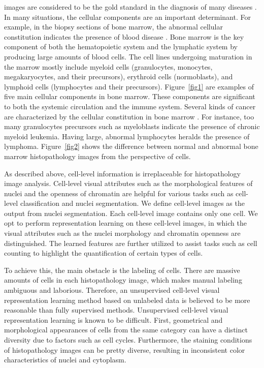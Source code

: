 \documentclass[journal]{IEEEtran}
\begin{document}
 images are considered to be the gold standard in the diagnosis of many diseases \cite{Gurcan2009histopathological}. In many situations, the cellular components are an important determinant. For example, in the biopsy sections of bone marrow, the abnormal cellular constitution indicates the presence of blood disease \cite{Bennett1976Proposals}. Bone marrow is the key component of both the hematopoietic system and the lymphatic system by producing large amounts of blood cells. The cell lines undergoing maturation in the marrow mostly include myeloid cells (granulocytes, monocytes, megakaryocytes, and their precursors), erythroid cells (normoblasts), and lymphoid cells (lymphocytes and their precursors). Figure~\ref{fig1} are examples of five main cellular components in bone marrow. These components are significant to both the systemic circulation and the immune system. Several kinds of cancer are characterized by the cellular constitution in bone marrow \cite{Bennett1976Proposals}. For instance, too many granulocytes precursors such as myeloblasts indicate the presence of chronic myeloid leukemia. Having large, abnormal lymphocytes heralds the presence of lymphoma. Figure~\ref{fig2} shows the difference between normal and abnormal bone marrow histopathology images from the perspective of cells.

As described above, cell-level information is irreplaceable for histopathology image analysis. Cell-level visual attributes such as the morphological features of nuclei and the openness of chromatin are helpful for various tasks such as cell-level classification and nuclei segmentation. We define cell-level images as the output from nuclei segmentation. Each cell-level image contains only one cell. We opt to perform representation learning on these cell-level images, in which the visual attributes such as the nuclei morphology and chromatin openness are distinguished. The learned features are further utilized to assist tasks such as cell counting to highlight the quantification of certain types of cells.

To achieve this, the main obstacle is the labeling of cells. There are massive amounts of cells in each histopathology image, which makes manual labeling ambiguous and laborious. Therefore, an unsupervised cell-level visual representation learning method based on unlabeled data is believed to be more reasonable than fully supervised methods. Unsupervised cell-level visual representation learning is known to be difficult. First, geometrical and morphological appearances of cells from the same category can have a distinct diversity due to factors such as cell cycles. Furthermore, the staining conditions of histopathology images can be pretty diverse, resulting in inconsistent color characteristics of nuclei and cytoplasm.
\end{document}
